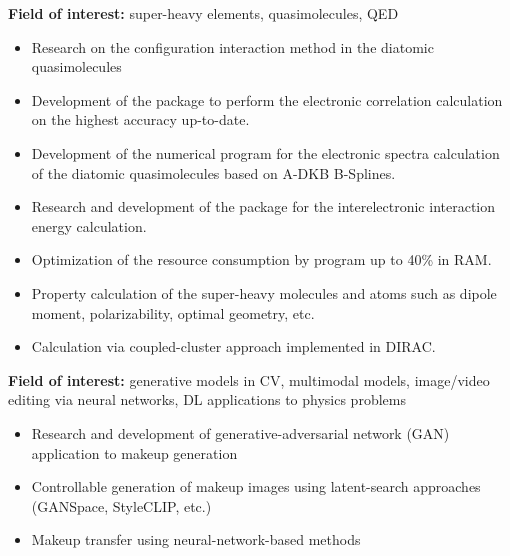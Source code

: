 \textbf{Field of interest:} super-heavy elements, quasimolecules, QED

\divider

\begin{itemize}
    \item Research on the configuration interaction method in the diatomic quasimolecules
    \item Development of the package to perform the electronic correlation calculation on the highest accuracy up-to-date.
\end{itemize}

\begin{itemize}
    \item Development of the numerical program for the electronic spectra calculation of the diatomic quasimolecules based on A-DKB B-Splines.
    \item Research and development of the package for the interelectronic interaction energy calculation.
    \item Optimization of the resource consumption by program up to 40\% in RAM.
\end{itemize}

\begin{itemize}
    \item Property calculation of the super-heavy molecules and atoms such as dipole moment, polarizability, optimal geometry, etc.
    \item Calculation via coupled-cluster approach implemented in DIRAC.
\end{itemize}

\textbf{Field of interest:} generative models in CV, multimodal models, image/video editing via neural networks, DL applications to physics problems

\divider

\begin{itemize}
    \item Research and development of generative-adversarial network (GAN) application to makeup generation
    \item Controllable generation of makeup images using latent-search approaches (GANSpace, StyleCLIP, etc.)
    \item Makeup transfer using neural-network-based methods
\end{itemize}

